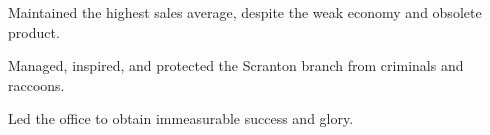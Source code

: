 \begin{achievements}
	\item Maintained the highest sales average, despite the weak economy and obsolete product.
	\item Managed, inspired, and protected the Scranton branch from criminals and raccoons.
	\item Led the office to obtain immeasurable success and glory.
\end{achievements}
